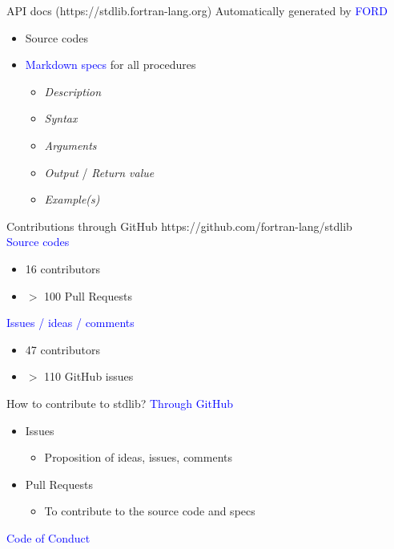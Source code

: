 \documentclass{beamer}
\begin{document}
\begin{frame}[c]{API docs (https://stdlib.fortran-lang.org)}
	Automatically generated by \textcolor{blue}{FORD} %
	\begin{itemize}
		\item Source codes
		\item \textcolor{blue}{Markdown specs} for all procedures
		\begin{itemize}
			\item \textit{Description}
			\item \textit{Syntax}
			\item \textit{Arguments}
			\item \textit{Output} / \textit{Return value}
			\item \textit{Example(s)}
		\end{itemize}
	\end{itemize}

\end{frame}


\begin{frame}[c]{Contributions through GitHub}
	https://github.com/fortran-lang/stdlib\\
	\textcolor{blue}{Source codes}
	\begin{itemize}
		\item 16 contributors
		\item $>$ 100 Pull Requests
	\end{itemize}
	\textcolor{blue}{Issues / ideas / comments}
	\begin{itemize}
		\item 47 contributors
		\item $>$ 110 GitHub issues
	\end{itemize}	
\end{frame}


\begin{frame}[c]{How to contribute to stdlib?}
	\textcolor{blue}{Through GitHub}\\
	\begin{itemize}
		\item Issues
		\begin{itemize}
			\item Proposition of ideas, issues, comments
		\end{itemize}
		\item Pull Requests
		\begin{itemize}
			\item To contribute to the source code and specs
		\end{itemize}
	\end{itemize}
	\textcolor{blue}{Code of Conduct}\\
\end{frame}
\end{document}
